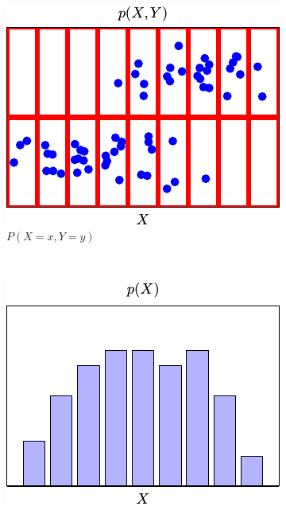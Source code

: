\begin{figure}
    \centering
    \begin{subfigure}[b]{0.3\textwidth}
        \centering
        \includegraphics[width=\textwidth]{images/probability/joint.png}
        \caption{$P(X=x,Y=y)$}
        \label{fig:probability-example-joint}
    \end{subfigure}
    ~
    \begin{subfigure}[b]{0.3\textwidth}
        \centering
        \includegraphics[width=\textwidth]{images/probability/marginal-x.png}

\end{subfigure}
\end{figure}
